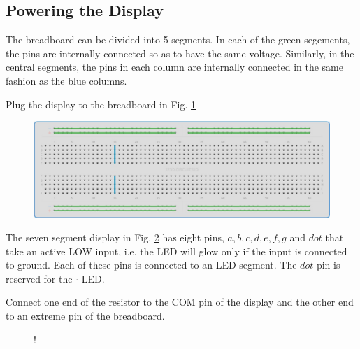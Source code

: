 \subsection{Powering the Display}
The breadboard can be divided into 5 segments.  In each of the green segements, the pins are internally connected so as to have the same voltage.  Similarly, in the central segments, the pins in each column  are internally connected in the same fashion as the blue columns. 

\begin{problem}
	Plug the display to the breadboard in Fig. \ref{fig:breadboard}
\end{problem}
\begin{figure}[!h]
\begin{center}
\includegraphics[width=\columnwidth]{./figs/breadboard}
\end{center}
\caption{}
\label{fig:breadboard}
\end{figure}

The seven segment display in Fig. \ref{fig:sevenseg} has eight pins, $a, b, c, d, e, f, g$ and $dot$ that take an active LOW input, i.e.  the LED will glow only if the input is connected to ground.  Each of these pins is connected to an LED segment.  The $dot$ pin is  reserved for the $\cdot$ LED.  

%

\begin{problem}
	Connect one end of the resistor to the COM pin of the display and the other end to an extreme pin of the breadboard.	
\end{problem}
%
%
%
\begin{figure}[!h]
\begin{center}
 {!} {

}
\end{center}
\caption{}
\label{fig:sevenseg}
\end{figure}

